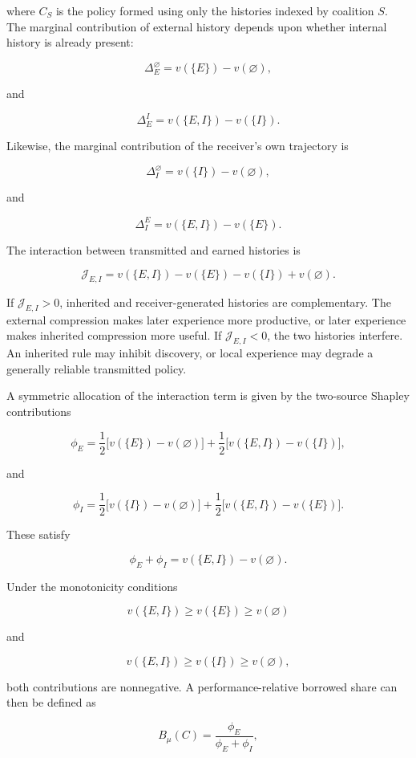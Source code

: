 \documentclass[11pt]{article}
\begin{document}
where $C_S$ is the policy formed using only the histories indexed by coalition $S$. The marginal contribution of external history depends upon whether internal history is already present:

\[
\Delta_E^{\varnothing}
=
v(\{E\})-v(\varnothing),
\]

and

\[
\Delta_E^{I}
=
v(\{E,I\})-v(\{I\}).
\]

Likewise, the marginal contribution of the receiver's own trajectory is

\[
\Delta_I^{\varnothing}
=
v(\{I\})-v(\varnothing),
\]

and

\[
\Delta_I^{E}
=
v(\{E,I\})-v(\{E\}).
\]

The interaction between transmitted and earned histories is

\[
\mathcal{J}_{E,I}
=
v(\{E,I\})
-
v(\{E\})
-
v(\{I\})
+
v(\varnothing).
\]

If $\mathcal{J}_{E,I}>0$, inherited and receiver-generated histories are complementary. The external compression makes later experience more productive, or later experience makes inherited compression more useful. If $\mathcal{J}_{E,I}<0$, the two histories interfere. An inherited rule may inhibit discovery, or local experience may degrade a generally reliable transmitted policy.

A symmetric allocation of the interaction term is given by the two-source Shapley contributions

\[
\phi_E
=
\frac{1}{2}
\bigl[
v(\{E\})-v(\varnothing)
\bigr]
+
\frac{1}{2}
\bigl[
v(\{E,I\})-v(\{I\})
\bigr],
\]

and

\[
\phi_I
=
\frac{1}{2}
\bigl[
v(\{I\})-v(\varnothing)
\bigr]
+
\frac{1}{2}
\bigl[
v(\{E,I\})-v(\{E\})
\bigr].
\]

These satisfy

\[
\phi_E+\phi_I
=
v(\{E,I\})-v(\varnothing).
\]

Under the monotonicity conditions

\[
v(\{E,I\})\geq v(\{E\})\geq v(\varnothing)
\]

and

\[
v(\{E,I\})\geq v(\{I\})\geq v(\varnothing),
\]

both contributions are nonnegative. A performance-relative borrowed share can then be defined as

\[
B_{\mu}(C)
=
\frac{\phi_E}
{\phi_E+\phi_I},
\]
\end{document}
